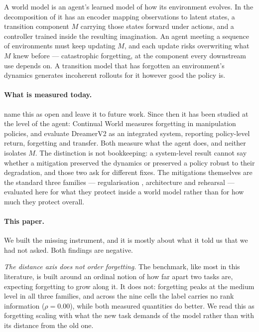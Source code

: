 \documentclass[11pt]{article}
\begin{document}
A world model is an agent's learned model of how its environment evolves. In
the decomposition of \citet{ha2018worldmodels} it has an encoder mapping
observations to latent states, a transition component $M$ carrying those states
forward under actions, and a controller trained inside the resulting
imagination. An agent meeting a sequence of environments must keep updating
$M$, and each update risks overwriting what $M$ knew before --- catastrophic
forgetting, at the component every downstream use depends on. A transition
model that has forgotten an environment's dynamics generates incoherent
rollouts for it however good the policy is.

\paragraph{What is measured today.} \citet{ha2018worldmodels} name this as open
and leave it to future work. Since then it has been studied at the level of the
agent: Continual World \citep{wolczyk2021continualworld} measures forgetting in
manipulation policies, and \citet{kessler2023effectiveness} evaluate DreamerV2
as an integrated system, reporting policy-level return, forgetting and
transfer. Both measure what the agent does, and neither isolates $M$. The
distinction is not bookkeeping: a system-level result cannot say whether a
mitigation preserved the dynamics or preserved a policy robust to their
degradation, and those two ask for different fixes. The mitigations themselves
are the standard three families --- regularisation
\citep{kirkpatrick2017ewc}, architecture \citep{rusu2016progressive} and
rehearsal \citep{vandeven2024continual} --- evaluated here for what they
protect inside a world model rather than for how much they protect overall.

\paragraph{This paper.} We built the missing instrument, and it is mostly about
what it told us that we had not asked. Both findings are negative.

\emph{The distance axis does not order forgetting.} The benchmark, like most in
this literature, is built around an ordinal notion of how far apart two tasks
are, expecting forgetting to grow along it. It does not: forgetting peaks at
the medium level in all three families, and across the nine cells the label
carries no rank information ($\rho = 0.00$), while both measured quantities do
better. We read this as forgetting scaling with what the new task demands of
the model rather than with its distance from the old one.
\end{document}

